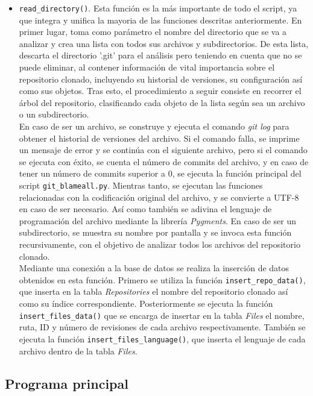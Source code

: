 \documentclass[a4paper, 12pt]{book}
\begin{document}
\begin{itemize}
  \item \texttt{read\_directory()}. Esta función es la más importante de todo el script, ya que integra y unifica la mayoria de las funciones descritas anteriormente. En primer lugar, toma como parámetro el nombre del directorio que se va a analizar y crea una lista con todos sus archivos y subdirectorios.
  De esta lista, descarta el directorio '.git' para el análisis pero teniendo en cuenta que no se puede eliminar, al contener información de vital importancia sobre el repositorio clonado, incluyendo su historial de versiones, su configuración así como sus objetos. Tras esto, el procedimiento a seguir consiste
  en recorrer el árbol del repositorio, clasificando cada objeto de la lista según sea un archivo o un subdirectorio. 
  \\En caso de ser un archivo, se construye y ejecuta el comando \textit{git log} para obtener el historial de versiones del archivo. Si el comando falla, se imprime un mensaje de error y se continúa con el siguiente archivo, pero si el comando se ejecuta con éxito, se cuenta el número de commits del archivo, y 
  en caso de tener un número de commits superior a 0, se ejecuta la función principal del script \texttt{git\_blameall.py}. Mientras tanto, se ejecutan las funciones relacionadas con la codificación original del archivo, y se convierte a UTF-8 en caso de ser necesario. Así como también se adivina el lenguaje de
  programación del archivo mediante la librería \textit{Pygments}. En caso de ser un subdirectorio, se muestra su nombre por pantalla y se invoca esta función recursivamente, con el objetivo de analizar todos los archivos del repositorio clonado.
  \\Mediante una conexión a la base de datos se realiza la inserción de datos obtenidos en esta función. Primero se utiliza la función \texttt{insert\_repo\_data()}, que inserta en la tabla \textit{Repositories} el nombre del repositorio clonado así como su índice correspondiente. Posteriormente se ejecuta la función
  \texttt{insert\_files\_data()} que se encarga de insertar en la tabla \textit{Files} el nombre, ruta, ID y número de revisiones de cada archivo respectivamente. También se ejecuta la función \texttt{insert\_files\_language()}, que inserta el lenguaje de cada archivo dentro de la tabla \textit{Files}.
\end{itemize}

\subsection{Programa principal}
\label{subsec:programa-principal}
\end{document}
